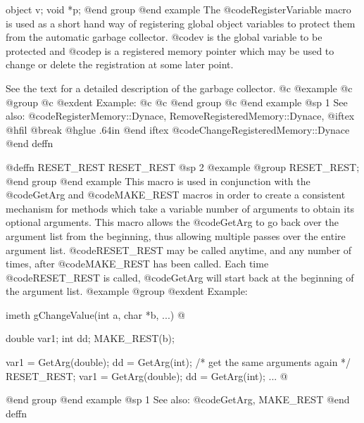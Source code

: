 {{{{object  v;
void    *p;
@end group
@end example
The @code{RegisterVariable} macro is used as a short hand way of
registering global object variables to protect them from the
automatic garbage collector.  @code{v} is the global variable to be
protected and @code{p} is a registered memory pointer which may
be used to change or delete the registration at some later point.

See the text for a detailed description of the garbage collector.
@c @example
@c @group
@c @exdent Example:
@c 
@c @end group
@c @end example
@sp 1
See also:  @code{RegisterMemory::Dynace, RemoveRegisteredMemory::Dynace,}
@iftex
@hfil @break @hglue .64in      
@end iftex
@code{ChangeRegisteredMemory::Dynace}
@end deffn













@deffn {RESET_REST} RESET_REST
@sp 2
@example
@group
RESET_REST;
@end group
@end example
This macro is used in conjunction with the @code{GetArg} and
@code{MAKE_REST} macros in order
to create a consistent mechanism for methods which take a variable
number of arguments to obtain its optional arguments.  This macro
allows the @code{GetArg} to go back over the argument list from
the beginning, thus allowing multiple passes over the entire
argument list.  @code{RESET_REST} may be called anytime, and any
number of times, after @code{MAKE_REST} has been called.  Each time
@code{RESET_REST} is called, @code{GetArg} will start back at the
beginning of the argument list.
@example
@group
@exdent Example:

imeth  gChangeValue(int a, char *b, ...)
@{
        double  var1;
        int     dd;
        MAKE_REST(b);

        var1 = GetArg(double);
        dd = GetArg(int);
        /*  get the same arguments again  */
        RESET_REST;
        var1 = GetArg(double);
        dd = GetArg(int);
        ...
@}
@end group
@end example
@sp 1
See also:  @code{GetArg, MAKE_REST}
@end deffn



















}}}}

